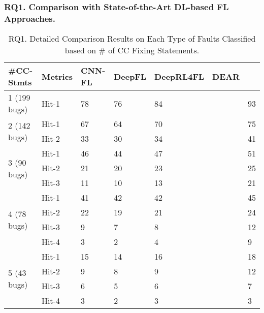 \subsubsection{\bf RQ1. Comparison with State-of-the-Art DL-based FL Approaches.}
\label{sec:rq1-result}

\begin{table}[t]
	\caption{RQ1. Detailed Comparison Results on Each Type of Faults Classified based on \# of CC Fixing Statements.}
	\vspace{-10pt}
        \tabcolsep 2pt
	{\small
		\begin{center}
			\renewcommand{\arraystretch}{1}
			\begin{tabular}{p{1.3cm}<{\centering}|p{0.8cm}<{\centering}|p{1cm}<{\centering}|p{0.8cm}<{\centering}|p{1.3cm}<{\centering}|p{1cm}<{\centering}|p{1.3cm}<{\centering}}
				\hline
				\#CC-Stmts & Metrics & CNN-FL & DeepFL & DeepRL4FL & DEAR & \tool \\
				\hline
				\multirow{1}{*}{1 (199 bugs)}   & Hit-1  & 78 & 76 & 84 & & 93 \\
				\hline
				\multirow{2}{*}{2 (142 bugs)}  & Hit-1   & 67 & 64 & 70 & & 75 \\
				& Hit-2         & 33 & 30 & 34 & & 41 \\
				\hline
				\multirow{3}{*}{3 (90 bugs)}  & Hit-1    & 46 & 44 & 47 & & 51 \\
				& Hit-2     & 21 & 20 & 23 & & 25\\
				& Hit-3     & 11 &10 & 13 & & 21 \\
				\hline
				\multirow{4}{*}{4 (78 bugs)}  & Hit-1    & 41 & 42 & 42 & & 45 \\
				& Hit-2     &22 & 19 & 21 & & 24 \\
				& Hit-3     & 9 & 7 & 8 & & 12 \\
				& Hit-4     & 3 & 2 & 4 & & 9 \\
				\hline
				\multirow{5}{*}{5 (43 bugs)}  & Hit-1    & 15 & 14 & 16 & & 18 \\
				& Hit-2     & 9 & 8 & 9 & & 12 \\
				& Hit-3     & 6 & 5 & 6 & & 7 \\
				& Hit-4     & 3 & 2 & 3 & & 3 \\

\end{tabular}
\end{center}}
\end{table}
